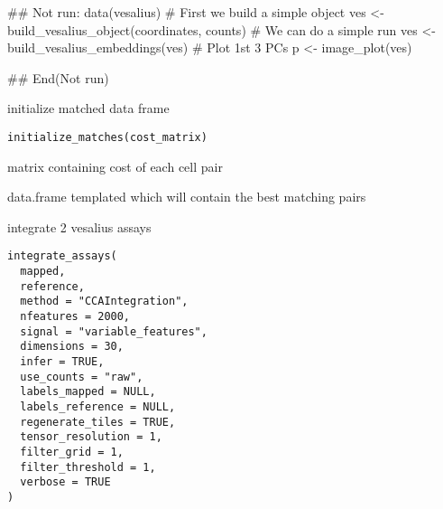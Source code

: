 \documentclass[a4paper]{book}
\begin{document}
%
\begin{Examples}
\begin{ExampleCode}
## Not run: 
data(vesalius)
# First we build a simple object
ves <- build_vesalius_object(coordinates, counts)
# We can do a simple run 
ves <- build_vesalius_embeddings(ves)
# Plot 1st 3 PCs
p <- image_plot(ves)


## End(Not run)
\end{ExampleCode}
\end{Examples}
%
\begin{Description}
initialize matched data frame
\end{Description}
%
\begin{Usage}
\begin{verbatim}
initialize_matches(cost_matrix)
\end{verbatim}
\end{Usage}
%
\begin{Arguments}
\begin{ldescription}
\item[\code{cost\_matrix}] matrix containing cost of each cell pair
\end{ldescription}
\end{Arguments}
%
\begin{Value}
data.frame templated which will contain the best matching pairs
\end{Value}
%
\begin{Description}
integrate 2 vesalius assays
\end{Description}
%
\begin{Usage}
\begin{verbatim}
integrate_assays(
  mapped,
  reference,
  method = "CCAIntegration",
  nfeatures = 2000,
  signal = "variable_features",
  dimensions = 30,
  infer = TRUE,
  use_counts = "raw",
  labels_mapped = NULL,
  labels_reference = NULL,
  regenerate_tiles = TRUE,
  tensor_resolution = 1,
  filter_grid = 1,
  filter_threshold = 1,
  verbose = TRUE
)
\end{verbatim}
\end{Usage}
%
\end{document}
